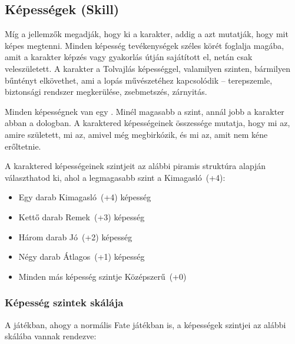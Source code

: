 \subsection[Képességek]{Képességek (Skill)}

Míg a jellemzők megadják, hogy ki a karakter, addig a  azt mutatják, hogy mit képes megtenni. Minden képesség tevékenységek széles körét foglalja magába, amit a karakter képzés vagy gyakorlás útján sajátított el, netán csak veleszületett. A karakter a Tolvajlás képességgel, valamilyen szinten, bármilyen bűntényt elkövethet, ami a lopás művészetéhez kapcsolódik -- terepszemle, biztonsági rendszer megkerülése, zsebmetszés, zárnyitás.

Minden képességnek van egy . Minél magasabb a szint, annál jobb a karakter abban a dologban. A karaktered képességeinek összessége mutatja, hogy mi az, amire született, mi az, amivel még megbirkózik, és mi az, amit nem kéne erőltetnie.

A karaktered képességeinek szintjeit az alábbi piramis struktúra alapján választhatod ki, ahol a legmagasabb szint a Kimagasló~(+4):

\begin{itemize}
    \item Egy darab Kimagasló~(+4) képesség
    \item Kettő darab Remek~(+3) képesség
    \item Három darab Jó~(+2) képesség
    \item Négy darab Átlagos~(+1) képesség
    \item Minden más képesség szintje Középszerű~(+0)
\end{itemize}

\label{Képesség szintek skálája}
\subsubsection{Képesség szintek skálája}

A  játékban, ahogy a normális Fate játékban is, a képességek szintjei az alábbi skálába vannak rendezve:

\begin{center}
\end{center}
